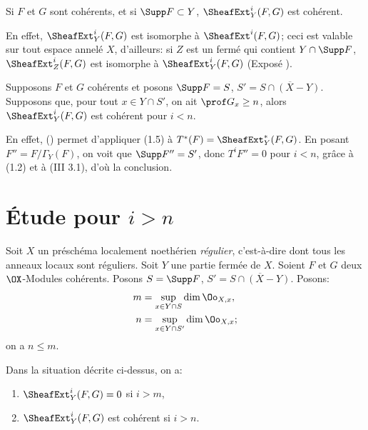 \begin{lemme}\label{VII.1.6}
Si $F$ et $G$ sont coh\'erents, et si $\Supp F \subset Y$, $\SheafExt^i_Y (F, G)$ est coh\'erent.
\end{lemme}

En effet, $\SheafExt^i_Y (F, G)$ est isomorphe \`a $\SheafExt^i (F, G)$; ceci est valable sur tout espace annel\'e $X$, d'ailleurs: si $Z$ est un ferm\'e qui contient $Y \cap \Supp F$, $\SheafExt^i_Z (F, G)$ est isomorphe \`a $\SheafExt^i_Y (F, G)$ (\cf Expos\'e ).

\begin{proposition}\label{VII.1.7}
\hspace*{3mm}Supposons $F$ et $G$ coh\'erents et posons $\Supp F = S$, $S' = \overline{S \cap (X-Y)}$. Supposons que, pour tout $x \in Y \cap S'$, on ait $\prof G_x \geq n$, alors $\SheafExt^i_Y (F, G)$ est coh\'erent pour $i < n$.
\end{proposition}

En effet, () permet d'appliquer (1.5) \`a $T^{\ast}(F) = \SheafExt^{\ast}_Y (F, G)$. En posant $F'' = F/ \Gamma_Y (F)$, on voit que $\Supp F'' = S'$, donc $T^i F'' = 0$ pour $i < n$, gr\^ace \`a (1.2) et \`a (III 3.1), d'o\`u la conclusion.

\section{\'Etude pour $i>n$}\label{VII.2}
\pageoriginale
Soit $X$ un pr\'esch\'ema localement noeth\'erien \emph{r\'egulier}, c'est-\`a-dire dont tous les anneaux locaux sont r\'eguliers. Soit $Y$ une partie ferm\'ee de $X$. Soient $F$ et $G$ deux $\OX$-Modules coh\'erents. Posons $S = \Supp F$, $S' = \overline{S \cap (X - Y)}$. Posons:
\begin{align*}
m& = \sup_{x \in Y \cap S} \dim \Oo_{X, x},\\
n &= \sup_{x \in Y \cap S'} \dim \Oo_{X, x};
\end{align*}
on a $n \leq m$.

\begin{proposition}\label{VII.2.1}
Dans la situation d\'ecrite ci-dessus, on a:
\begin{enumerate}
\item
$\SheafExt^i_Y (F, G) = 0$ si $i > m$,

\item
$\SheafExt^i_Y (F, G)$ est coh\'erent si $i > n$.
\end{enumerate}
\end{proposition}

